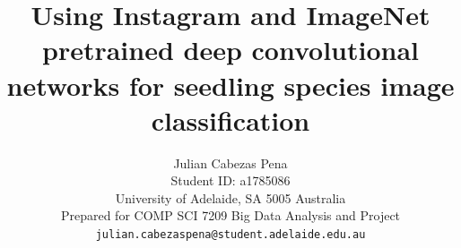 \documentclass[11pt,onecolumn,titlepage,letterpaper]{article}
\begin{document}
\title{Using Instagram and ImageNet pretrained deep convolutional networks for seedling species image classification}

\author{Julian Cabezas Pena\\
Student ID: a1785086\\
University of Adelaide, SA 5005 Australia\\
Prepared for COMP SCI 7209 Big Data Analysis and Project \\
{\tt\small julian.cabezaspena@student.adelaide.edu.au}
}

\maketitle
\end{document}
